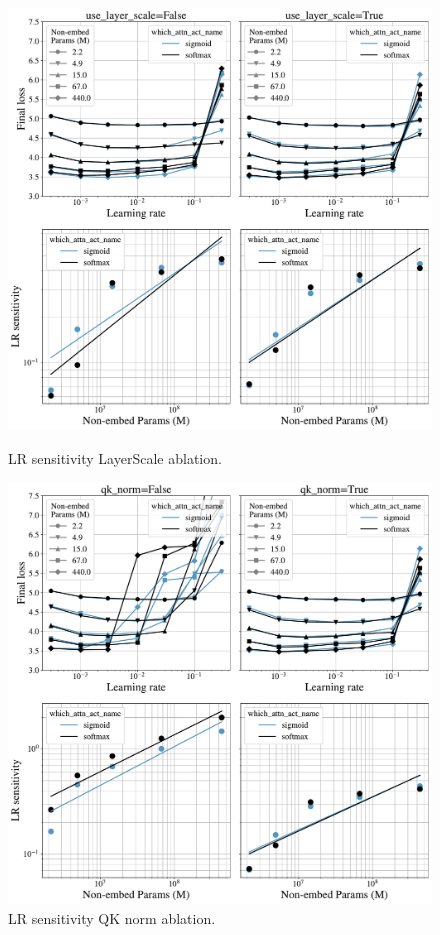 \begin{figure}[h]
    \centering
    \begin{minipage}[t]{0.48\textwidth}
        \centering
        \includegraphics[width=\textwidth]{figures/lines=activation-cols=layerscale_with_log_n_or_max3std.pdf} 
        \caption{LR sensitivity LayerScale ablation.}
        \label{fig:layerscale_ablation}
    \end{minipage}%
    \hfill
    \begin{minipage}[t]{0.48\textwidth}
        \centering
        \includegraphics[width=\textwidth]{figures/lines=activation-cols=qknorm_with_log_n_or_max3std.pdf}
        \caption{LR sensitivity QK norm ablation.}
        \label{fig:qk_norm_ablation}
    \end{minipage}
\end{figure}
